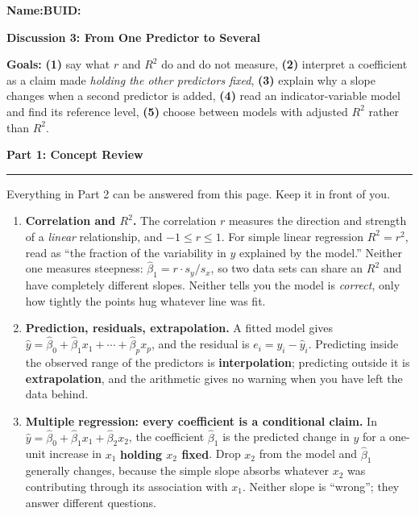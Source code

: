 \documentclass[11pt]{article}
\newcommand{\blankline}[1]{\underline{\hspace{#1}}}
\newcommand{\parttitle}[1]{%
  \par\medskip\noindent
  {\large\bfseries #1}\par
  \vspace{-.5em}\noindent\rule{\linewidth}{0.4pt}\par\smallskip}
\begin{document}
\noindent\textbf{Name:}\blankline{2.3in}\hfill\textbf{BUID:}\blankline{1.6in}

\begin{center}
  {\Large\bfseries Discussion 3: From One Predictor to Several}
\end{center}

\noindent\textbf{Goals:} \textbf{(1)} say what $r$ and $R^2$ do and do not measure,
\textbf{(2)} interpret a coefficient as a claim made \emph{holding the other predictors fixed},
\textbf{(3)} explain why a slope changes when a second predictor is added, \textbf{(4)} read an
indicator-variable model and find its reference level, \textbf{(5)} choose between models with
adjusted $R^2$ rather than $R^2$.

\parttitle{Part 1: Concept Review}

{\small

\noindent Everything in Part 2 can be answered from this page. Keep it in front of you.

\begin{enumerate}[label=\textbf{\arabic*.}, wide=0pt, itemsep=.55em, topsep=.5em]

\item \textbf{Correlation and $R^2$.} The correlation $r$ measures the direction and strength of a
\emph{linear} relationship, and $-1 \le r \le 1$. For simple linear regression $R^2 = r^2$, read as
``the fraction of the variability in $y$ explained by the model.'' Neither one measures steepness:
$\hat\beta_1 = r \cdot s_y / s_x$, so two data sets can share an $R^2$ and have completely
different slopes. Neither tells you the model is \emph{correct}, only how tightly the points hug
whatever line was fit.

\item \textbf{Prediction, residuals, extrapolation.} A fitted model gives
$\hat{y} = \hat\beta_0 + \hat\beta_1 x_1 + \cdots + \hat\beta_p x_p$, and the residual is
$e_i = y_i - \hat{y}_i$. Predicting inside the observed range of the predictors is
\textbf{interpolation}; predicting outside it is \textbf{extrapolation}, and the arithmetic gives
no warning when you have left the data behind.

\item \textbf{Multiple regression: every coefficient is a conditional claim.} In
$\hat{y} = \hat\beta_0 + \hat\beta_1 x_1 + \hat\beta_2 x_2$, the coefficient $\hat\beta_1$ is the
predicted change in $y$ for a one-unit increase in $x_1$ \textbf{holding $x_2$ fixed}. Drop $x_2$
from the model and $\hat\beta_1$ generally changes, because the simple slope absorbs whatever
$x_2$ was contributing through its association with $x_1$. Neither slope is ``wrong''; they answer
different questions.


\end{enumerate}}
\end{document}
